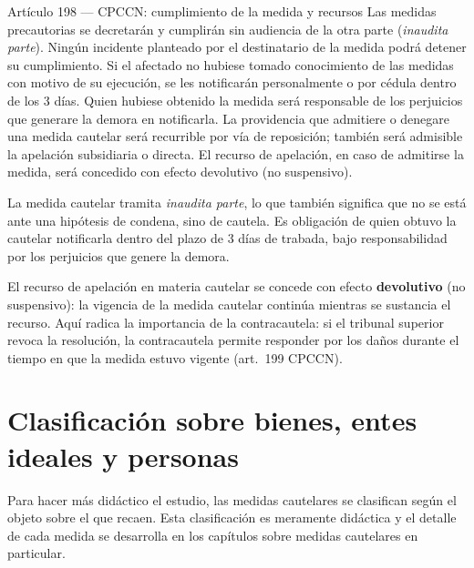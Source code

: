 \documentclass[12pt,oneside]{book}
\begin{document}
\begin{normativa}{Artículo 198 --- CPCCN: cumplimiento de la medida y recursos}
Las medidas precautorias se decretarán y cumplirán sin audiencia de la otra parte (\textit{inaudita parte}). Ningún incidente planteado por el destinatario de la medida podrá detener su cumplimiento. Si el afectado no hubiese tomado conocimiento de las medidas con motivo de su ejecución, se les notificarán personalmente o por cédula dentro de los 3 días. Quien hubiese obtenido la medida será responsable de los perjuicios que generare la demora en notificarla. La providencia que admitiere o denegare una medida cautelar será recurrible por vía de reposición; también será admisible la apelación subsidiaria o directa. El recurso de apelación, en caso de admitirse la medida, será concedido con efecto devolutivo (no suspensivo).
\end{normativa}

La medida cautelar tramita \textit{inaudita parte}, lo que también significa que no se está ante una hipótesis de condena, sino de cautela. Es obligación de quien obtuvo la cautelar notificarla dentro del plazo de 3 días de trabada, bajo responsabilidad por los perjuicios que genere la demora.

\begin{important}
El recurso de apelación en materia cautelar se concede con efecto \textbf{devolutivo} (no suspensivo): la vigencia de la medida cautelar continúa mientras se sustancia el recurso. Aquí radica la importancia de la contracautela: si el tribunal superior revoca la resolución, la contracautela permite responder por los daños durante el tiempo en que la medida estuvo vigente (art.~199 CPCCN).
\end{important}

\section{Clasificación sobre bienes, entes ideales y personas}

Para hacer más didáctico el estudio, las medidas cautelares se clasifican según el objeto sobre el que recaen. Esta clasificación es meramente didáctica y el detalle de cada medida se desarrolla en los capítulos sobre medidas cautelares en particular.
\end{document}
